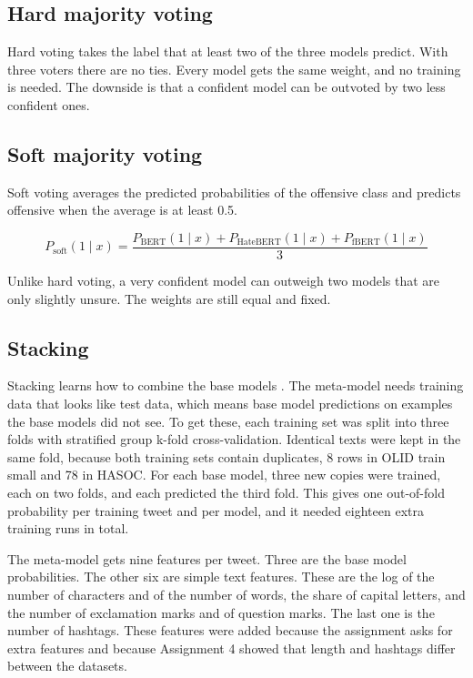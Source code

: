 \documentclass[11pt,a4paper]{article}
\begin{document}
\subsection{Hard majority voting}

Hard voting takes the label that at least two of the three models predict. With three voters there are no ties. Every model gets the same weight, and no training is needed. The downside is that a confident model can be outvoted by two less confident ones.

\subsection{Soft majority voting}

Soft voting averages the predicted probabilities of the offensive class and predicts offensive when the average is at least 0.5.

\begin{equation}
P_{\mathrm{soft}}(1 \mid x) = \frac{P_{\mathrm{BERT}}(1 \mid x) + P_{\mathrm{HateBERT}}(1 \mid x) + P_{\mathrm{fBERT}}(1 \mid x)}{3}
\end{equation}

Unlike hard voting, a very confident model can outweigh two models that are only slightly unsure. The weights are still equal and fixed.

\subsection{Stacking}

Stacking learns how to combine the base models \citep{wolpert1992stacked}. The meta-model needs training data that looks like test data, which means base model predictions on examples the base models did not see. To get these, each training set was split into three folds with stratified group k-fold cross-validation. Identical texts were kept in the same fold, because both training sets contain duplicates, 8 rows in OLID train small and 78 in HASOC. For each base model, three new copies were trained, each on two folds, and each predicted the third fold. This gives one out-of-fold probability per training tweet and per model, and it needed eighteen extra training runs in total.

The meta-model gets nine features per tweet. Three are the base model probabilities. The other six are simple text features. These are the log of the number of characters and of the number of words, the share of capital letters, and the number of exclamation marks and of question marks. The last one is the number of hashtags. These features were added because the assignment asks for extra features and because Assignment 4 showed that length and hashtags differ between the datasets.
\end{document}
